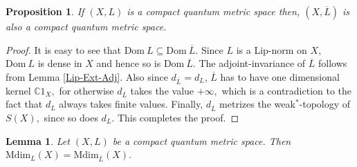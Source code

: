 \documentclass[a4paper,11pt,reqno]{amsart}
\theoremstyle{plain}
\newtheorem{lem}[thm]{Lemma}
\newtheorem{prop}[thm]{Proposition}
\theoremstyle{mainthmstyle}
\theoremstyle{named}
\numberwithin{equation}{section}
\begin{document}
\begin{prop}
    If $(X,L)$ is a compact quantum metric space then, $(X,\overline{L})$ is also a compact quantum metric space.
\end{prop}
\begin{proof}
    It is easy to see that $\mathrm {Dom}\ L \subseteq \mathrm {Dom}\ \overline {L}.$ Since $L$ is a Lip-norm on $X,$ $\mathrm {Dom}\ L$ is dense in $X$ and hence so is $\mathrm {Dom}\ \overline {L}.$ The adjoint-invariance of $\overline {L}$ follows from Lemma \ref{Lip-Ext-Adj}. Also since $d_{\overline {L}} = d_{L}$,  $\overline {L}$ has to have one dimensional kernel $\mathbb C 1_{X},$ for otherwise $d_{\overline {L}}$ takes the value $+\infty,$ which is a contradiction to the fact that $d_{L}$ always takes finite values. Finally,  $d_{\overline {L}}$ metrizes the weak$^{\ast}$-topology of $S (X),$ since so does $d_{L}.$ This completes the proof. 
\end{proof}
\begin{lem} \label{Mdim-Inv}
Let $(X,L)$ be a compact quantum metric space. Then $\mathrm {Mdim}_{L} (X) = \mathrm {Mdim}_{\overline {L}} (X).$
\end{lem}
\end{document}
